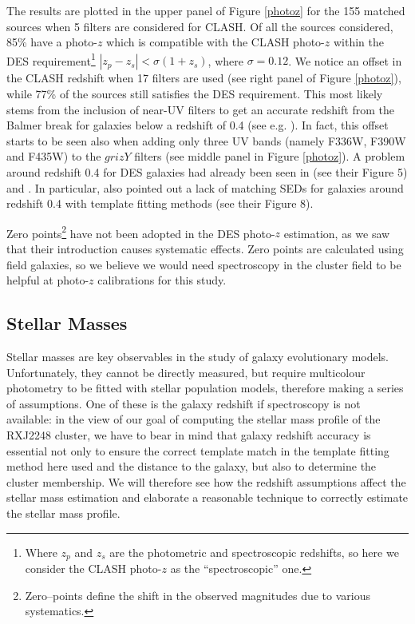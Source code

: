 {The results are plotted in the upper panel of Figure \ref{photoz} for the 155 matched sources when 5 filters are considered for CLASH. 
 Of all the sources considered, 85\% have a photo-$z$ which is compatible with the CLASH photo-$z$ within the DES requirement\footnote{Where $z_p$ and $z_s$ are the photometric and spectroscopic redshifts, so here we consider the CLASH photo-$z$ as the ``spectroscopic'' one. } $|z_{p}-z_{s}|< \sigma(1+z_{s})$, where $\sigma=0.12$. 
We notice an offset in the CLASH redshift when 17 filters are used (see right panel of Figure \ref{photoz}), while 77\% of the sources still satisfies the DES requirement. This most likely stems from the inclusion of near-UV filters to get an accurate redshift from the Balmer break for galaxies below a redshift of 0.4 (see e.g. \citealt{Eisenstein2}). In fact, this offset starts to be seen also when adding only three UV bands (namely F336W, F390W and F435W) to the $grizY$ filters (see middle panel in Figure \ref{photoz}). A problem around redshift 0.4 for DES galaxies had already been seen in \citet{sanchez} (see their Figure 5) and \citet{bonnett}. In particular, \citet{bonnett} also pointed out a lack of matching SEDs for galaxies around redshift 0.4 with template fitting methods (see their Figure 8). 

Zero points\footnote{Zero--points define the shift in the observed magnitudes due to various systematics.} have not been adopted in the DES photo-$z$ estimation, as we saw that their introduction causes systematic effects. Zero points are calculated using field galaxies, so we believe we would need spectroscopy in the cluster field to be helpful at photo-$z$ calibrations for this study.\\

\subsection{Stellar Masses}\label{clash_sm}

Stellar masses are key observables in the study of galaxy evolutionary models. Unfortunately, they cannot be directly measured, but require multicolour photometry to be fitted with stellar population models, therefore making a series of assumptions. One of these is the galaxy redshift if spectroscopy is not available: in the view of our goal of computing the stellar mass profile of the RXJ2248 cluster, we have to bear in mind that galaxy redshift accuracy is essential not only to ensure the correct template match in the template fitting method here used and the distance to the galaxy, but also to determine the cluster membership. We will therefore see how the redshift assumptions affect the stellar mass estimation and elaborate a reasonable technique to correctly estimate the stellar mass profile.

}
